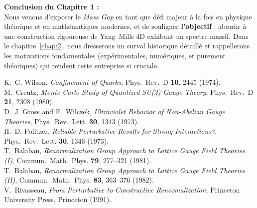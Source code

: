 \bigskip

\noindent
\textbf{Conclusion du Chapitre 1 :} \\
Nous venons d’exposer le \emph{Mass Gap} en tant que défi majeur à la fois en physique théorique et en mathématiques modernes, et de souligner \textbf{l’objectif} : aboutir à une construction rigoureuse de Yang--Mills 4D exhibant un spectre massif. Dans le chapitre~\ref{chap:2}, nous dresserons un survol historique détaillé et rappellerons les motivations fondamentales (expérimentales, numériques, et purement théoriques) qui rendent cette entreprise si cruciale.

\vspace{2em}

\begin{thebibliography}{99}
	
	K.~G. Wilson,
	\textit{Confinement of Quarks},
	Phys.~Rev.~D \textbf{10}, 2445 (1974).
	\\[-0.75em]
	
	M.~Creutz,
	\textit{Monte Carlo Study of Quantized SU(2) Gauge Theory},
	Phys.~Rev.~D \textbf{21}, 2308 (1980).
	\\[-0.75em]
	
	D.~J. Gross and F.~Wilczek,
	\textit{Ultraviolet Behavior of Non-Abelian Gauge Theories},
	Phys.~Rev.~Lett. \textbf{30}, 1343 (1973).
	\\[-0.75em]
	
	H.~D. Politzer,
	\textit{Reliable Perturbative Results for Strong Interactions?},
	Phys.~Rev.~Lett. \textbf{30}, 1346 (1973).
	\\[-0.75em]
	
	T.~Balaban,
	\textit{Renormalization Group Approach to Lattice Gauge Field Theories (I)},
	Commun.~Math.~Phys. \textbf{79}, 277--321 (1981).
	\\[-0.75em]
	
	T.~Balaban,
	\textit{Renormalization Group Approach to Lattice Gauge Field Theories (II)},
	Commun.~Math.~Phys. \textbf{83}, 363--376 (1982).
	\\[-0.75em]
	
	V.~Rivasseau,
	\textit{From Perturbative to Constructive Renormalization},
	Princeton University Press, Princeton (1991).
	
\end{thebibliography}

